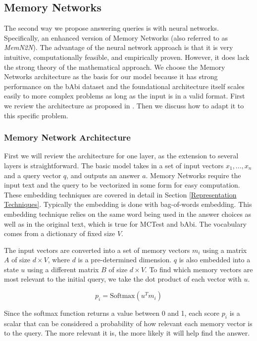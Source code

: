 \documentclass[pageno]{final_paper}
\begin{document}
\subsection{Memory Networks}
\label{Memory Networks}

The second way we propose answering queries is with neural networks.
Specifically, an enhanced version of Memory Networks (also referred to as
\textit{MemN2N}). The advantage of the neural network approach is that it is
very intuitive, computationally feasible, and empirically proven. However, it
does lack the strong theory of the mathematical approach. We choose the Memory
Networks architecture as the basis for our model because it has strong
performance on the bAbi dataset and the foundational architecture itself scales
easily to more complex problems as long as the input is in a valid format. First
we review the architecture as proposed in \cite{Sukhbaatar2015}. Then we discuss
how to adapt it to this specific problem.

\subsubsection{Memory Network Architecture}
\label{Memory Network Architecture}

First we will review the architecture for one layer, as the extension to several
layers is straightforward. The basic model takes in a set of input vectors $x_1, ...,
x_n$ and a query vector $q$, and outputs an answer $a$. Memory Networks require
the input text and the query to be vectorized in some form for easy computation.
These embedding techniques are covered in detail in Section \ref{Representation
Techniques}. Typically the embedding is done with bag-of-words embedding. This
embedding technique relies on the same word being used in the answer choices as
well as in the original text, which is true for MCTest and bAbi. The vocabulary
comes from a dictionary of fixed size $V$.

The input vectors are converted into a set of memory vectors ${m_i}$ using a
matrix $A$ of size $d\times V$, where $d$ is a pre-determined dimension. $q$ is
also embedded into a state $u$ using a different matrix $B$ of size $d\times V$.
To find which memory vectors are most relevant to the initial query, we take the
dot product of each vector with $u$.

$$p_i = \text{Softmax}(u^Tm_i)$$

Since the softmax function returns a value between 0 and 1, each score $p_i$ is
a scalar that can be considered a probability of how relevant each memory vector
is to the query. The more relevant it is, the more likely it will help find the
answer.
\end{document}

